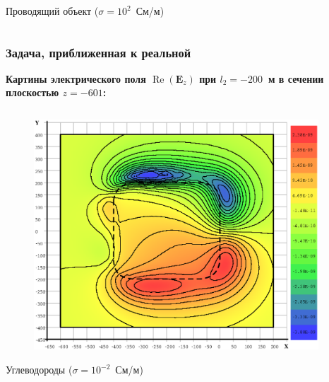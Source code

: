 \documentclass[aspectratio=43,usepdftitle=false]{beamer}
\renewcommand{\Re}{\mathop{\mathrm{Re}}\nolimits}
\newcommand{\MakeTitle}[1]{\frametitle{\hspace{1.5em}\textbf{#1} \hfill \insertframenumber{} }}
\begin{document}
\begin{frame}
\begin{columns}[t,totalwidth=\linewidth]
\begin{column}{.5\linewidth}
\begin{figure}[H]
			\end{figure}
			\begin{center}
				\vspace{-1em}
				\tiny{Проводящий объект ($\sigma = 10^{2}$~См/м)}
			\end{center}
		\end{column}
	\end{columns}
\end{frame}


\begin{frame}
	\MakeTitle{Задача, приближенная к реальной}
	\textbf{Картины электрического поля $\Re(\mathbf{E}_z)$ при $l_2 = -200$~м в сечении плоскостью $z=-601$:}
	\begin{columns}[t,totalwidth=\linewidth]
		\hspace{-0.07\linewidth}
		\begin{column}{.5\linewidth}
			\vspace{-2.75em}
			\begin{figure}[H]
				\includegraphics[width=1.1\textwidth,height=1.1\textheight,keepaspectratio]{200_no_z=-601_EzR.eps}
			\end{figure}
			\begin{center}
				\vspace{-1em}
				\tiny{Углеводороды ($\sigma = 10^{-2}$~См/м)}
			\end{center}
		\end{column}
		\begin{column}{.5\linewidth}

\end{column}
\end{columns}
\end{frame}
\end{document}
